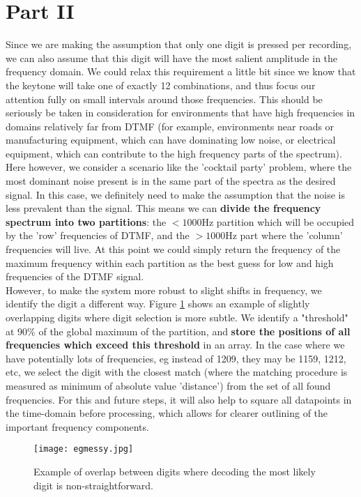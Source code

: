 \documentclass{article}
\begin{document}
\section{Part II}
Since we are making the assumption that only one digit is pressed per recording, we can also assume that this digit will have the most salient amplitude in the frequency domain.
We could relax this requirement a little bit since we know that the keytone will take one of exactly 12 combinations, and thus focus our attention fully on small intervals around those frequencies.
This should be seriously be taken in consideration for environments that have high frequencies in domains relatively far from DTMF (for example, environments near roads or manufacturing equipment, which can have dominating low noise, or electrical equipment, which can contribute to the high frequency parts of the spectrum).
Here however, we consider a scenario like the 'cocktail party' problem, where the most dominant noise present is in the same part of the spectra as the desired signal.
In this case, we definitely need to make the assumption that the noise is less prevalent than the signal.
This means we can \textbf{divide the frequency spectrum into two partitions}: the $<1000$Hz partition which will be occupied by the 'row' frequencies of DTMF, and the $>1000$Hz part where the 'column' frequencies will live.
At this point we could simply return the frequency of the maximum frequency within each partition as the best guess for low and high frequencies of the DTMF signal. \\
However, to make the system more robust to slight shifts in frequency, we identify the digit a different way. Figure \ref{messy} shows an example of slightly overlapping digits where digit selection is more subtle. We identify a "threshold" at 90\% of the global maximum of the partition, and \textbf{store the positions of all frequencies which exceed this threshold} in an array.
In the case where we have potentially lots of frequencies, eg instead of 1209, they may be 1159, 1212, etc, we select the digit with the closest match (where the matching procedure is measured as minimum of absolute value 'distance') from the set of all found frequencies.
For this and future steps, it will also help to square all datapoints in the time-domain before processing, which allows for clearer outlining of the important frequency components.
\begin{figure}[h]
	\texttt{[image: egmessy.jpg]}
	\caption{Example of overlap between digits where decoding the most likely digit is non-straightforward.}
	\label{messy}
\end{figure}
\end{document}
